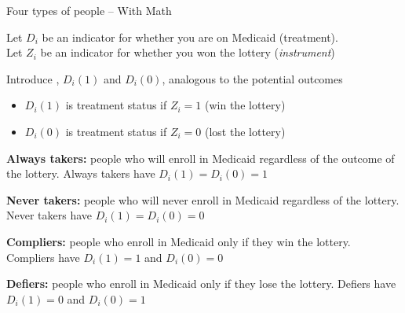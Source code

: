 \documentclass[11pt,english,handout]{beamer}
\newenvironment{wideitemize}{\itemize\addtolength{\itemsep}{10pt}}{\enditemize}
\begin{document}
\begin{frame}{Four types of people -- With Math}
	
		
	\begin{wideitemize}
		\item
		Let $D_i$ be an indicator for whether you are on Medicaid (treatment).\\
		Let $Z_i$ be an indicator for whether you won the lottery (\textit{instrument})
		
		\pause
		\item
		Introduce , $D_i(1)$ and $D_i(0)$, analogous to the potential outcomes
			\begin{itemize}
				\item 
				$D_i(1)$ is treatment status if $Z_i=1$ (win the lottery)
				
				\item
				$D_i(0)$ is treatment status if $Z_i=0$ (lost the lottery)
				
			\end{itemize}
		

		\pause
		\item
		\textbf{Always takers:} people who will enroll in Medicaid regardless of the outcome of the lottery. \pause Always takers have $D_i(1) = D_i(0) = 1$
		
		\pause
		\item  \textbf{Never takers:} people who will never enroll in Medicaid regardless of the lottery. \pause Never takers have $D_i(1) = D_i(0) = 0$
			
		
		\pause
		\item \textbf{Compliers:} people who enroll in Medicaid only if they win the lottery. \pause Compliers have $D_i(1) = 1$ and $D_i(0) = 0$
		
		\pause
		\item \textbf{Defiers:} people who enroll in Medicaid only if they lose the lottery. \pause Defiers have $D_i(1) = 0$ and $D_i(0) = 1$
			
	\end{wideitemize}
	
\end{frame}
\end{document}

